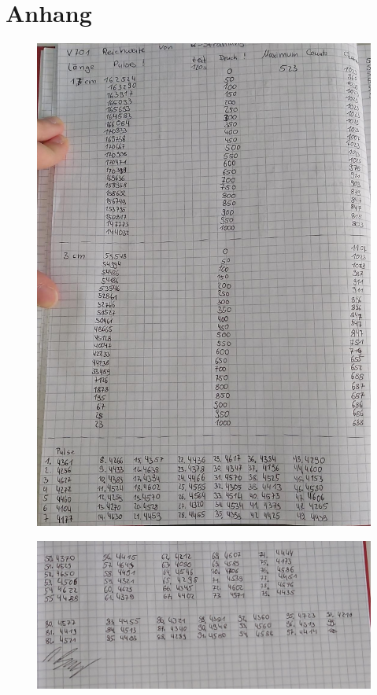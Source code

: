 \section{Anhang}\label{sec:Anhang}
\begin{figure}[h]
   \centering
    \includegraphics[scale=0.45]{build/KladdeS1.jpeg}
\end{figure}
\begin{figure}[h]
    \centering
    \includegraphics[scale=0.45]{build/KladdeS2.jpeg}
 \end{figure}
\pagebreak
